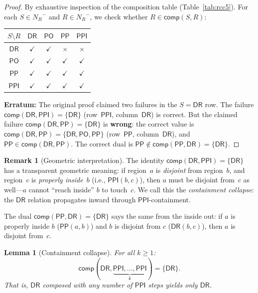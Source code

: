\documentclass[a4paper,11pt]{article}
\newtheorem{lemma}[theorem]{Lemma}
\theoremstyle{definition}
\newtheorem{remark}[theorem]{Remark}
\newcommand{\NR}{\ensuremath{N_R}}
\newcommand{\DR}{\ensuremath{\mathsf{DR}}}
\newcommand{\PO}{\ensuremath{\mathsf{PO}}}
\newcommand{\PP}{\ensuremath{\mathsf{PP}}}
\newcommand{\PPI}{\ensuremath{\mathsf{PPI}}}
\newcommand{\comp}{\ensuremath{\mathsf{comp}}}
\begin{document}
\begin{proof}
By exhaustive inspection of the composition table
(Table~\ref{tab:rcc5}).  For each $S \in \NR^{-}$ and $R \in
\NR^{-}$, we check whether $R \in \comp(S, R)$:

\smallskip
\begin{center}
\renewcommand{\arraystretch}{1.1}
\begin{tabular}{c|cccc}
\toprule
$S \setminus R$ & $\DR$ & $\PO$ & $\PP$ & $\PPI$ \\
\midrule
$\DR$  & $\checkmark$ & $\checkmark$ & $\times$ & $\times$ \\
$\PO$  & $\checkmark$ & $\checkmark$ & $\checkmark$ & $\checkmark$ \\
$\PP$  & $\checkmark$ & $\checkmark$ & $\checkmark$ & $\checkmark$ \\
$\PPI$ & $\checkmark$ & $\checkmark$ & $\checkmark$ & $\checkmark$ \\
\bottomrule
\end{tabular}
\end{center}

\smallskip\noindent
\textbf{Erratum:} The original proof claimed two failures in the
$S = \DR$ row.  The failure $\comp(\DR, \PPI) = \{\DR\}$
(row~$\PPI$, column~$\DR$) is correct.  But the claimed failure
$\comp(\DR, \PP) = \{\DR\}$ is \textbf{wrong}: the correct value is
$\comp(\DR, \PP) = \{\DR, \PO, \PP\}$ (row~$\PP$, column~$\DR$),
and $\PP \in \comp(\DR, \PP)$.  The correct dual is
$\PP \notin \comp(\PP, \DR) = \{\DR\}$.
\end{proof}

\begin{remark}[Geometric interpretation]
\label{rem:geometric}
The identity $\comp(\DR, \PPI) = \{\DR\}$ has a transparent geometric
meaning: if region~$a$ is \emph{disjoint} from region~$b$, and
region~$c$ is \emph{properly inside}~$b$ (i.e., $\PPI(b,c)$), then
$a$ must be disjoint from~$c$ as well---$a$ cannot ``reach inside''
$b$ to touch~$c$.  We call this the \emph{containment collapse}:
the $\DR$ relation propagates inward through $\PPI$-containment.

The dual $\comp(\PP, \DR) = \{\DR\}$ says the same from the inside
out: if $a$ is properly inside $b$ ($\PP(a,b)$) and $b$ is disjoint
from $c$ ($\DR(b,c)$), then $a$ is disjoint from~$c$.
\end{remark}

\begin{lemma}[Containment collapse]
\label{lem:containment-collapse}
For all $k \geq 1$:
\[
  \comp(\DR, \underbrace{\PPI, \ldots, \PPI}_{k}) = \{\DR\}.
\]
That is, $\DR$ composed with any number of $\PPI$ steps yields only
$\DR$.
\end{lemma}
\end{document}
